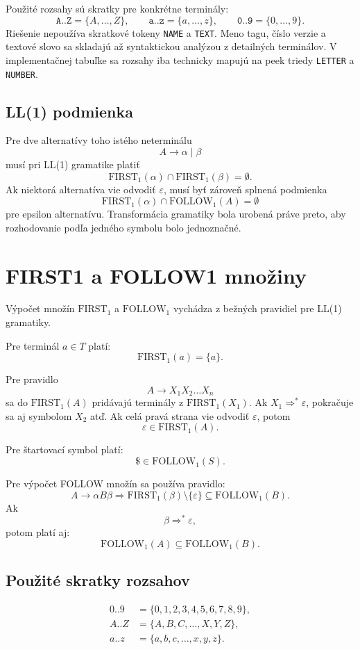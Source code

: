 \documentclass[12pt,a4paper]{article}
\newcommand{\eps}{\varepsilon}
\newcommand{\First}{\mathrm{FIRST}_1}
\newcommand{\Follow}{\mathrm{FOLLOW}_1}
\newcommand{\code}[1]{\ifmmode\text{\ttfamily #1}\else\texttt{#1}\fi}
\begin{document}
Použité rozsahy sú skratky pre konkrétne terminály:
\[
\texttt{A..Z} = \{A,\ldots,Z\},
\qquad
\texttt{a..z} = \{a,\ldots,z\},
\qquad
\texttt{0..9} = \{0,\ldots,9\}.
\]
Riešenie nepoužíva skratkové tokeny \code{NAME} a \code{TEXT}. Meno tagu, číslo verzie a textové slovo sa skladajú až syntaktickou analýzou z detailných terminálov. V implementačnej tabuľke sa rozsahy iba technicky mapujú na peek triedy \code{LETTER} a \code{NUMBER}.

\subsection{LL(1) podmienka}

Pre dve alternatívy toho istého neterminálu
\[
A \to \alpha \mid \beta
\]
musí pri LL(1) gramatike platiť
\[
\First(\alpha) \cap \First(\beta) = \emptyset.
\]
Ak niektorá alternatíva vie odvodiť \(\eps\), musí byť zároveň splnená podmienka
\[
\First(\alpha) \cap \Follow(A) = \emptyset
\]
pre epsilon alternatívu. Transformácia gramatiky bola urobená práve preto, aby rozhodovanie podľa jedného symbolu bolo jednoznačné.

\section{FIRST1 a FOLLOW1 množiny}

Výpočet množín \(\First\) a \(\Follow\) vychádza z bežných pravidiel pre LL(1) gramatiky.

Pre terminál \(a \in T\) platí:
\[
\First(a) = \{a\}.
\]

Pre pravidlo
\[
A \to X_1X_2\ldots X_n
\]
sa do \(\First(A)\) pridávajú terminály z \(\First(X_1)\). Ak \(X_1 \Rightarrow^* \eps\), pokračuje sa aj symbolom \(X_2\) atď. Ak celá pravá strana vie odvodiť \(\eps\), potom
\[
\eps \in \First(A).
\]

Pre štartovací symbol platí:
\[
\$ \in \Follow(S).
\]

Pre výpočet FOLLOW množín sa používa pravidlo:
\[
A \to \alpha B \beta
\Rightarrow
\First(\beta) \setminus \{\eps\} \subseteq \Follow(B).
\]
Ak
\[
\beta \Rightarrow^* \eps,
\]
potom platí aj:
\[
\Follow(A) \subseteq \Follow(B).
\]

\subsection{Použité skratky rozsahov}

\begin{align*}
0..9 &= \{0,1,2,3,4,5,6,7,8,9\},\\
A..Z &= \{A,B,C,\ldots,X,Y,Z\},\\
a..z &= \{a,b,c,\ldots,x,y,z\}.
\end{align*}
\end{document}
